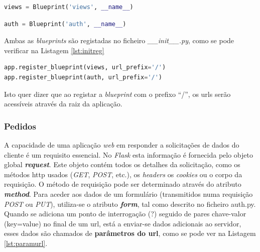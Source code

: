 \begin{center}
	\begin{minipage}{0.7\linewidth}
		\begin{lstlisting}[language=Python, caption=\textit{Blueprint views} - \textit{views.py}, label=lst:blueprintviews]
views = Blueprint('views', __name__)
\end{lstlisting}
	\end{minipage}
\end{center}

\begin{center}
	\begin{minipage}{0.7\linewidth}
		\begin{lstlisting}[language=Python, caption=\textit{Blueprint auth} - \textit{auth.py}, label=lst:blueprintauth]
auth = Blueprint('auth', __name__)
\end{lstlisting}
	\end{minipage}
\end{center}

Ambas as \textit{blueprints} são registadas no ficheiro \textit{\_\_init\_\_.py}, como se pode verificar na Listagem \ref{lst:initreg}

\begin{center}
	\begin{minipage}{0.7\linewidth}
		\begin{lstlisting}[language=Python, caption=Registo das \textit{blueprints} - \textit{\_\_init\_\_.py}, label=lst:initreg]
app.register_blueprint(views, url_prefix='/')
app.register_blueprint(auth, url_prefix='/')
\end{lstlisting}
	\end{minipage}
\end{center}

Isto quer dizer que ao registar a \textit{blueprint} com o prefixo ``/'', os \acrshort{url}s serão acessíveis através da raiz da aplicação.

\subsubsection{Pedidos}
A capacidade de uma aplicação \textit{web} em responder a solicitações de dados do cliente é um requisito essencial. No \textit{Flask} esta informação é fornecida pelo objeto global \textit{\textbf{request}}. Este objeto contém todos os detalhes da solicitação, como os métodos \acrshort{http} usados (\textit{GET}, \textit{POST}, etc.), os \textit{headers} os \textit{cookies} ou o corpo da requisição. O método de requisição pode ser determinado através do atributo \textit{\textbf{method}}. Para aceder aos dados de um formulário (transmitidos numa requisição \textit{POST} ou \textit{PUT}), utiliza-se o atributo \textit{\textbf{form}}, tal como descrito no ficheiro auth.py. Quando se adiciona um ponto de interrogação (?) seguido de pares chave-valor (key=value) no final de um \acrshort{url}, está a enviar-se dados adicionais ao servidor, esses dados são chamados de \textbf{parâmetros do \acrshort{url}}, como se pode ver na Listagem \ref{lst:paramurl}.

